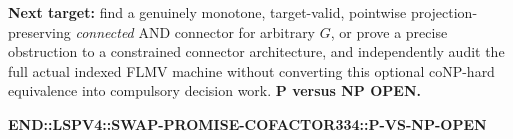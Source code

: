 \documentclass[11pt]{article}
\begin{document}
\noindent\textbf{Next target:} find a genuinely monotone, target-valid, pointwise projection-preserving \emph{connected} AND connector for arbitrary $G$, or prove a precise obstruction to a constrained connector architecture, and independently audit the full actual indexed FLMV machine without converting this optional coNP-hard equivalence into compulsory decision work. \textbf{P versus NP OPEN.}


\noindent\textbf{END::LSPV4::SWAP-PROMISE-COFACTOR334::P-VS-NP-OPEN}
\end{document}
